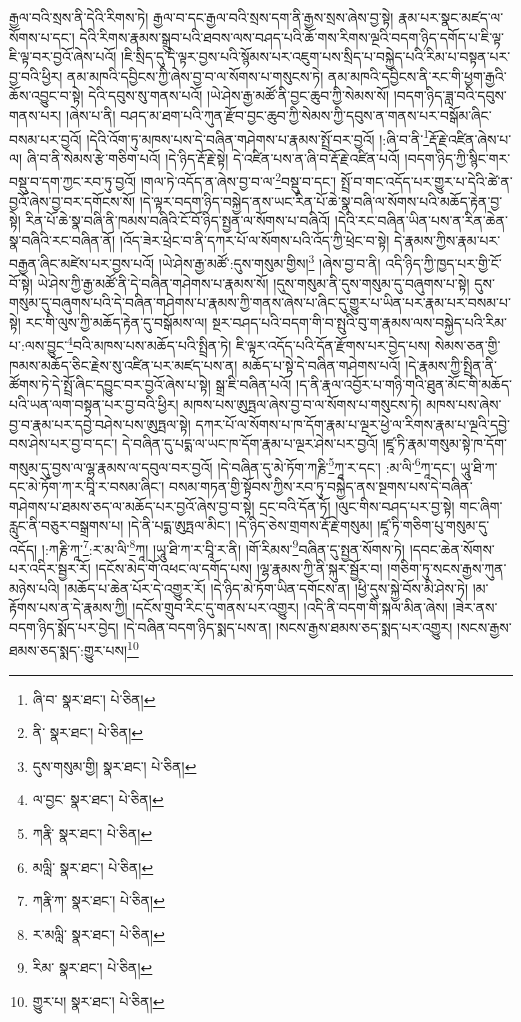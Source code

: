 རྒྱལ་བའི་སྲས་ནི་དེའི་རིགས་ཏེ། རྒྱལ་བ་དང་རྒྱལ་བའི་སྲས་དག་ནི་རྒྱས་སྲས་ཞེས་བྱ་སྟེ། རྣམ་པར་སྣང་མཛད་ལ་སོགས་པ་དང་། དེའི་རིགས་རྣམས་སྒྲུབ་པའི་ཐབས་ལས་བཤད་པའི་ཆོ་གས་རིགས་ལྔའི་བདག་ཉིད་དགོད་པ་ཇི་ལྟ་ཇི་ལྟ་བར་བྱའོ་ཞེས་པའོ། །ཇི་སྲིད་དུ་དེ་ལྟར་བྱས་པའི་སྙོམས་པར་འཇུག་པས་སྲིད་པ་བསྐྱེད་པའི་རིམ་པ་བསྟན་པར་བྱ་བའི་ཕྱིར། ནམ་མཁའི་དབྱིངས་ཀྱི་ཞེས་བྱ་བ་ལ་སོགས་པ་གསུངས་ཏེ། ནམ་མཁའི་དབྱིངས་ནི་རང་གི་ཕྱག་རྒྱའི་ཆོས་འབྱུང་བ་སྟེ། དེའི་དབུས་སུ་གནས་པའོ། །ཡེ་ཤེས་རྒྱ་མཚོ་ནི་བྱང་ཆུབ་ཀྱི་སེམས་སོ། །བདག་ཉིད་ཟླ་བའི་དབུས་གནས་པར། །ཞེས་པ་ནི། བཤད་མ་ཐག་པའི་ཀུན་རྫོབ་བྱང་ཆུབ་ཀྱི་སེམས་ཀྱི་དབུས་ན་གནས་པར་བསྒོམ་ཞིང་བསམ་པར་བྱའོ། །དེའི་འོག་ཏུ་མཁས་པས་དེ་བཞིན་གཤེགས་པ་རྣམས་སྤྲོ་བར་བྱའོ། །:ཞི་བ་ནི་\footnote{ཞི་བ་  སྣར་ཐང་།  པེ་ཅིན། }རྡོ་རྗེ་འཛིན་ཞེས་པ་ལ། ཞི་བ་ནི་སེམས་རྩེ་གཅིག་པའོ། །དེ་ཉིད་རྡོ་རྗེ་སྟེ། དེ་འཛིན་པས་ན་ཞི་བ་རྡོ་རྗེ་འཛིན་པའོ། །བདག་ཉིད་ཀྱི་སྙིང་གར་བསྡུ་བ་དག་ཀྱང་རབ་ཏུ་བྱའོ། །གལ་ཏེ་འདོད་ན་ཞེས་བྱ་བ་ལ་\footnote{ནི་  སྣར་ཐང་།  པེ་ཅིན། }བསྡུ་བ་དང་། སྤྲོ་བ་གང་འདོད་པར་གྱུར་པ་དེའི་ཚེ་ན་བྱའོ་ཞེས་བྱ་བར་དགོངས་སོ། །དེ་ལྟར་བདག་ཉིད་བསྐྱེད་ནས་ཡང་རིན་པོ་ཆེ་སྣ་བཞི་ལ་སོགས་པའི་མཆོད་རྟེན་བྱ་སྟེ། རིན་པོ་ཆེ་སྣ་བཞི་ནི་ཁམས་བཞིའི་ངོ་བོ་ཉིད་སྤྱན་ལ་སོགས་པ་བཞིའོ། །དེའི་རང་བཞིན་ཡིན་པས་ན་རིན་ཆེན་སྣ་བཞིའི་རང་བཞིན་ནོ། །འོད་ཟེར་ཕྲེང་བ་ནི་དཀར་པོ་ལ་སོགས་པའི་འོད་ཀྱི་ཕྲེང་བ་སྟེ། དེ་རྣམས་ཀྱིས་རྣམ་པར་བརྒྱན་ཞིང་མཛེས་པར་བྱས་པའོ། །ཡེ་ཤེས་རྒྱ་མཚོ་:དུས་གསུམ་གྱིས།\footnote{དུས་གསུམ་གྱི།  སྣར་ཐང་།  པེ་ཅིན། } །ཞེས་བྱ་བ་ནི། འདི་ཉིད་ཀྱི་ཁྱད་པར་གྱི་ངོ་བོ་སྟེ། ཡེ་ཤེས་ཀྱི་རྒྱ་མཚོ་ནི་དེ་བཞིན་གཤེགས་པ་རྣམས་སོ། །དུས་གསུམ་ནི་དུས་གསུམ་དུ་བཞུགས་པ་སྟེ། དུས་གསུམ་དུ་བཞུགས་པའི་དེ་བཞིན་གཤེགས་པ་རྣམས་ཀྱི་གནས་ཞེས་པ་ཞིང་དུ་གྱུར་པ་ཡིན་པར་རྣམ་པར་བསམ་པ་སྟེ། རང་གི་ལུས་ཀྱི་མཆོད་རྟེན་དུ་བསྒོམས་ལ། སྔར་བཤད་པའི་བདག་གི་བ་སྤུའི་བུ་ག་རྣམས་ལས་བསྐྱེད་པའི་རིམ་པ་:ལས་བྱུང་\footnote{ལ་བྱང་  སྣར་ཐང་།  པེ་ཅིན། }བའི་མཁས་པས་མཆོད་པའི་སྤྲིན་ཏེ། ཇི་ལྟར་འདོད་པའི་དོན་རྫོགས་པར་བྱེད་པས། སེམས་ཅན་གྱི་ཁམས་མཆོད་ཅིང་རྗེས་སུ་འཛིན་པར་མཛད་པས་ན། མཆོད་པ་སྟེ་དེ་བཞིན་གཤེགས་པའོ། །དེ་རྣམས་ཀྱི་སྤྲིན་ནི་ཚོགས་ཏེ་དེ་སྤྲོ་ཞིང་དབྱུང་བར་བྱའོ་ཞེས་པ་སྟེ། སྒྲ་ཇི་བཞིན་པའོ། །ད་ནི་རྣལ་འབྱོར་པ་གཉི་གའི་ཐུན་མོང་གི་མཆོད་པའི་ཡན་ལག་བསྟན་པར་བྱ་བའི་ཕྱིར། མཁས་པས་ཨུཏྤལ་ཞེས་བྱ་བ་ལ་སོགས་པ་གསུངས་ཏེ། མཁས་པས་ཞེས་བྱ་བ་རྣམ་པར་དབྱེ་བཤེས་པས་ཨུཏྤལ་སྟེ། དཀར་པོ་ལ་སོགས་པ་ཁ་དོག་རྣམ་པ་ལྔར་ཕྱེ་ལ་རིགས་རྣམ་པ་ལྔའི་དབྱེ་བས་ཤེས་པར་བྱ་བ་དང་། དེ་བཞིན་དུ་པདྨ་ལ་ཡང་ཁ་དོག་རྣམ་པ་ལྔར་ཤེས་པར་བྱའོ། །ཛཱ་ཏི་རྣམ་གསུམ་སྟེ་ཁ་དོག་གསུམ་དུ་བྱས་ལ་ལྷ་རྣམས་ལ་དབུལ་བར་བྱའོ། །དེ་བཞིན་དུ་མེ་ཏོག་ཀརྞི་\footnote{ཀརྣི་  སྣར་ཐང་།  པེ་ཅིན། }ཀཱ་ར་དང་། :མ་ལི་\footnote{མལླི་  སྣར་ཐང་།  པེ་ཅིན། }ཀཱ་དང་། ཡཱུ་ཐི་ཀ་དང་མེ་ཏོག་ཀ་ར་བཱི་ར་བསམ་ཞིང་། བསམ་གཏན་གྱི་སྟོབས་ཀྱིས་རབ་ཏུ་བསྐྱེད་ནས་སྔགས་པས་དེ་བཞིན་གཤེགས་པ་ཐམས་ཅད་ལ་མཆོད་པར་བྱའོ་ཞེས་བྱ་བ་སྟེ། དྲང་བའི་དོན་ཏོ། །ལུང་གིས་བཤད་པར་བྱ་སྟེ། གང་ཞིག་རླུང་ནི་བཅུར་བསྒྲགས་པ། །དེ་ནི་པདྨ་ཨུཏྤལ་མིང་། །དེ་ཉིད་ཅེས་གྲགས་རྡོ་རྗེ་གསུམ། །ཛཱ་ཏི་གཅིག་པུ་གསུམ་དུ་འདོད། །:ཀརྞི་ཀཱ་\footnote{ཀརྣི་ཀ་  སྣར་ཐང་།  པེ་ཅིན། }:ར་མ་ལི་\footnote{ར་མལླི་  སྣར་ཐང་།  པེ་ཅིན། }ཀཱ། །ཡཱུ་ཐི་ཀ་ར་བཱི་ར་ནི། །གོ་རིམས་\footnote{རིམ་  སྣར་ཐང་།  པེ་ཅིན། }བཞིན་དུ་སྤྱན་སོགས་ཏེ། །དབང་ཆེན་སོགས་པར་འདིར་སྦྱར་རོ། །དངོས་མེད་གོ་འཕང་ལ་དགོད་པས། །ལྷ་རྣམས་ཀྱི་ནི་སྐུར་སྦྱོར་བ། །གཅིག་ཏུ་སངས་རྒྱས་ཀུན་མཉེས་པའི། །མཆོད་པ་ཆེན་པོར་དེ་འགྱུར་རོ། །དེ་ཉིད་མེ་ཏོག་ཡིན་དགོངས་ན། །ཕྱི་དུས་སྐྱེ་བོས་མི་ཤེས་ཏེ། །མ་རྟོགས་པས་ན་དེ་རྣམས་ཀྱི། །དངོས་གྲུབ་རིང་དུ་གནས་པར་འགྱུར། །འདི་ནི་བདག་གི་སྐལ་མིན་ཞེས། །ཟེར་ནས་བདག་ཉིད་སྨོད་པར་བྱེད། །དེ་བཞིན་བདག་ཉིད་སྨད་པས་ན། །སངས་རྒྱས་ཐམས་ཅད་སྨད་པར་འགྱུར། །སངས་རྒྱས་ཐམས་ཅད་སྨད་:གྱུར་པས།\footnote{གྱུར་པ།  སྣར་ཐང་།  པེ་ཅིན། } 